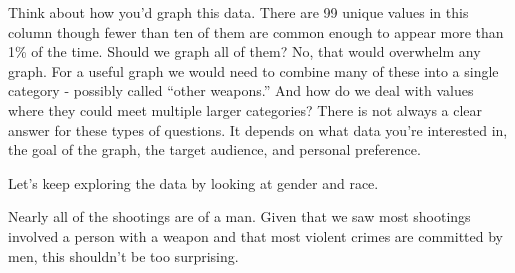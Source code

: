 \documentclass[
  12pt,
]{book}
\newenvironment{Shaded}{\begin{snugshade}}{\end{snugshade}}
\newcommand{\AttributeTok}[1]{\textcolor[rgb]{0.61,0.61,0.61}{#1}}
\newcommand{\CommentTok}[1]{\textcolor[rgb]{0.37,0.37,0.37}{\textit{#1}}}
\newcommand{\DecValTok}[1]{\textcolor[rgb]{0.06,0.06,0.06}{#1}}
\newcommand{\FunctionTok}[1]{\textcolor[rgb]{0,0,0}{#1}}
\newcommand{\NormalTok}[1]{#1}
\newcommand{\OtherTok}[1]{\textcolor[rgb]{0.37,0.37,0.37}{#1}}
\newcommand{\SpecialCharTok}[1]{\textcolor[rgb]{0,0,0}{#1}}
\begin{document}
Think about how you'd graph this data. There are 99 unique values in this column though fewer than ten of them are common enough to appear more than 1\% of the time. Should we graph all of them? No, that would overwhelm any graph. For a useful graph we would need to combine many of these into a single category - possibly called ``other weapons.'' And how do we deal with values where they could meet multiple larger categories? There is not always a clear answer for these types of questions. It depends on what data you're interested in, the goal of the graph, the target audience, and personal preference.

Let's keep exploring the data by looking at gender and race.

\begin{Shaded}
\end{Shaded}

Nearly all of the shootings are of a man. Given that we saw most shootings involved a person with a weapon and that most violent crimes are committed by men, this shouldn't be too surprising.

\begin{Shaded}
\end{Shaded}
\end{document}
